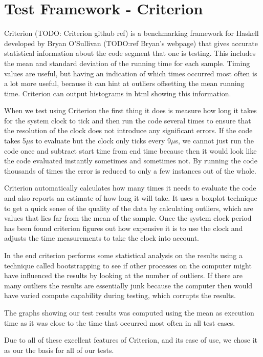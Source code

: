 
\section{Test Framework - Criterion}
Criterion (TODO: Criterion github ref) is a benchmarking framework for Haskell developed by Bryan O'Sullivan (TODO:ref Bryan's webpage) that gives accurate statistical information about the code segment that one is testing. This includes the mean and standard deviation of the running time for each sample. Timing values are useful, but having an indication of which times occurred most often is a lot more useful, because it can hint at outliers offsetting the mean running time. Criterion can output histograms in html showing this information. 

When we test using Criterion the first thing it does is measure how long it takes for the system clock to tick and then run the code several times to ensure that the resolution of the clock does not introduce any significant errors. If the code takes 5$\mu$s to evaluate but the clock only ticks every 9$\mu$s, we cannot just run the code once and subtract start time from end time because then it would look like the code evaluated instantly sometimes and sometimes not. By running the code thousands of times the error is reduced to only a few instances out of the whole. 

Criterion automatically calculates how many times it needs to evaluate the code and also reports an estimate of how long it will take. It uses a boxplot technique to get a quick sense of the quality of the data by calculating outliers, which are values that lies far from the mean of the sample. Once the system clock period has been found criterion figures out how expensive it is to use the clock and adjusts the time measurements to take the clock into account. 

In the end criterion performs some statistical analysis on the results using a technique called bootstrapping to see if other processes on the computer might have influenced the results by looking at the number of outliers. If there are many outliers the results are essentially junk because the computer then would have varied compute capability during testing, which corrupts the results.  

The graphs showing our test results was computed using the mean as execution time as it was close to the time that occurred most often in all test cases.

Due to all of these excellent features of Criterion, and its ease of use, we chose it as our the basis for all of our tests. 
